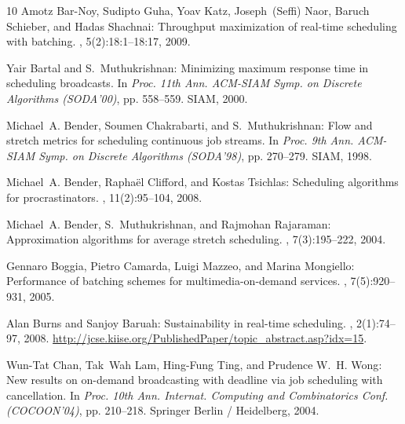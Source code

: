 \begin{thebibliography}{10}
{\sc Amotz Bar-Noy, Sudipto Guha, Yoav Katz, Joseph~(Seffi) Naor, Baruch
  Schieber, and Hadas Shachnai}: Throughput maximization of real-time
  scheduling with batching.
, 5(2):18:1--18:17, 2009.
\newblock [\epfmtdoi{10.1145/1497290.1497294}]

{\sc Yair Bartal and S.~Muthukrishnan}: Minimizing maximum response time in
  scheduling broadcasts.
\newblock In {\em Proc. 11th Ann. ACM-SIAM Symp. on Discrete Algorithms
  (SODA'00)}, pp. 558--559. SIAM, 2000.

{\sc Michael~A. Bender, Soumen Chakrabarti, and S.~Muthukrishnan}: Flow and
  stretch metrics for scheduling continuous job streams.
\newblock In {\em Proc. 9th Ann. ACM-SIAM Symp. on Discrete Algorithms
  (SODA'98)}, pp. 270--279. SIAM, 1998.

{\sc Michael~A. Bender, Rapha{\"e}l Clifford, and Kostas Tsichlas}: Scheduling
  algorithms for procrastinators.
, 11(2):95--104, 2008.
\newblock [\epfmtdoi{10.1007/s10951-007-0038-4}]

{\sc Michael~A. Bender, S.~Muthukrishnan, and Rajmohan Rajaraman}:
  Approximation algorithms for average stretch scheduling.
, 7(3):195--222, 2004.

{\sc Gennaro Boggia, Pietro Camarda, Luigi Mazzeo, and Marina Mongiello}:
  Performance of batching schemes for multimedia-on-demand services.
, 7(5):920--931, 2005.

{\sc Alan Burns and Sanjoy Baruah}: Sustainability in real-time scheduling.
, 2(1):74--97,
  2008.
\newblock \url{http://jcse.kiise.org/PublishedPaper/topic_abstract.asp?idx=15}.

{\sc Wun-Tat Chan, Tak~Wah Lam, Hing-Fung Ting, and Prudence W.~H. Wong}: New
  results on on-demand broadcasting with deadline via job scheduling with
  cancellation.
\newblock In {\em Proc. 10th Ann. Internat. Computing and Combinatorics Conf.
  (COCOON'04)}, pp. 210--218. Springer Berlin / Heidelberg, 2004.
\newblock [\epfmtdoi{10.1007/978-3-540-27798-9\_24}]


\end{thebibliography}

